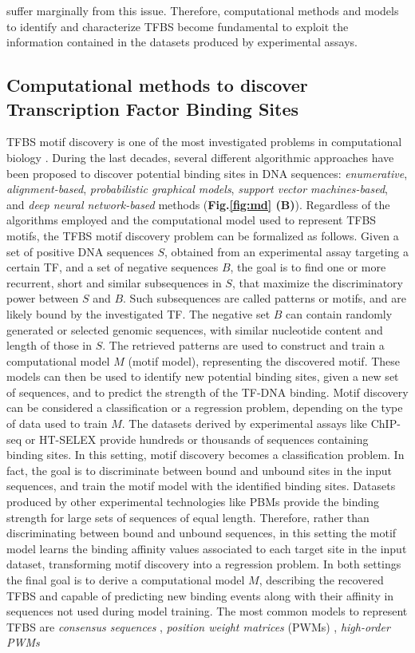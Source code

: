 \documentclass[a4paper, titlepage, 8pt, openright]{book}
\begin{document}
suffer marginally from this issue. Therefore, computational methods and models to identify and characterize TFBS become fundamental to exploit the information contained in the datasets produced by experimental assays.
\subsection{Computational methods to discover Transcription Factor Binding Sites}
TFBS motif discovery is one of the most investigated problems in computational biology \citep{tognon2022survey}. During the last decades, several different algorithmic approaches have been proposed to discover potential binding sites in DNA sequences: \emph{enumerative}, \emph{alignment-based}, \emph{probabilistic graphical models}, \emph{support vector machines-based}, and \emph{deep neural network-based} methods (\textbf{Fig.\ref{fig:md} (B)}). Regardless of the algorithms employed and the computational model used to represent TFBS motifs, the TFBS motif discovery problem can be formalized as follows. Given a set of positive DNA sequences $S$, obtained from an experimental assay targeting a certain TF, and a set of negative sequences $B$, the goal is to find one or more recurrent, short and similar subsequences in $S$, that maximize the discriminatory power between $S$ and $B$. Such subsequences are called patterns or motifs, and are likely bound by the investigated TF. The negative set $B$ can contain randomly generated or selected genomic sequences, with similar nucleotide content and length of those in $S$. The retrieved patterns are used to construct and train a computational model $M$ (motif model), representing  the discovered motif. These models can then be used to identify new potential binding sites, given a new set of sequences, and to predict the strength of the TF-DNA binding. Motif discovery can be considered a classification or a regression problem, depending on the type of data used to train $M$. The datasets derived by experimental assays like ChIP-seq or HT-SELEX provide hundreds or thousands of sequences containing binding sites. In this setting, motif discovery becomes a classification problem. In fact, the goal is to discriminate between bound and unbound sites in the input sequences, and train the motif model with the identified binding sites. Datasets produced by other experimental technologies like PBMs provide the binding strength for large sets of sequences of equal length. Therefore, rather than discriminating between bound and unbound sequences, in this setting the motif model learns the binding affinity values associated to each target site in the input dataset, transforming motif discovery into a regression problem. In both settings the final goal is to derive a computational model $M$, describing the recovered TFBS and capable of predicting new binding events along with their affinity in sequences not used during model training. The most common models to represent TFBS are \emph{consensus sequences} \citep{day1992critical}, \emph{position weight matrices} (PWMs) \citep{stormo2000dna,stormo2013modeling}, \emph{high-order PWMs} 
\end{document}
